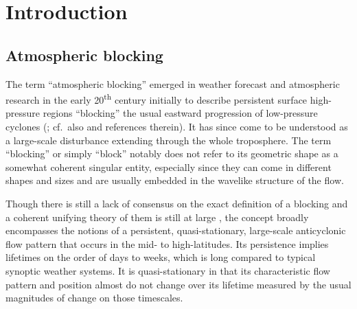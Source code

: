 
\chapter{Introduction}\label{ch:intro}

\section{Atmospheric blocking}\label{sec:intro_blocking}
The term \enquote{atmospheric blocking} emerged in weather forecast and
atmospheric research in the early 20\textsuperscript{th} century initially to
describe persistent
surface high-pressure regions \enquote{blocking} the usual eastward progression
of low-pressure cyclones (\textcite{rexBlockingActionMiddle1950}; cf.~also
\textcite{lupoAtmosphericBlockingEvents2021} and references therein).
It has since come to be understood as a large-scale disturbance
extending through the whole troposphere.
The term \enquote{blocking} or simply \enquote{block} notably does not refer
to its geometric shape as a somewhat coherent singular entity, especially since
they can come in different shapes and sizes and are usually embedded in the
wavelike structure of the flow.

Though there is still a lack of consensus on the exact definition of a blocking
and a coherent unifying theory of them is still
at large \parencite{wangGapsWaysForward2026}, the concept broadly encompasses
the notions of a persistent, quasi-stationary, large-scale anticyclonic flow
pattern that occurs in the mid- to high-latitudes. Its persistence implies
lifetimes on the order of days to weeks, which is long compared to typical
synoptic weather systems. It is quasi-stationary in that its characteristic
flow pattern and position almost do not change over its lifetime measured by
the usual magnitudes of change on those timescales.

